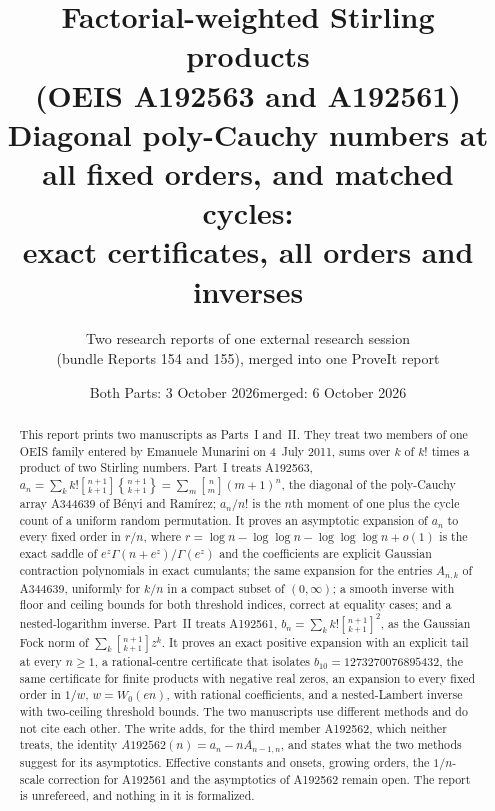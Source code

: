 \documentclass[11pt,letterpaper]{article}
\title{\textbf{Factorial-weighted Stirling products\\ (OEIS A192563 and A192561)}\\[7pt]
\large Diagonal poly-Cauchy numbers at all fixed orders, and matched cycles:\\ exact certificates, all orders and inverses}
\author{Two research reports of one external research session\\(bundle Reports 154 and 155), merged into one ProveIt report}
\date{Both Parts: 3 October 2026\quad merged: 6 October 2026}
\numberwithin{equation}{section}
\theoremstyle{definition}\newtheorem{definition}[theorem]{Definition}
\theoremstyle{remark}\newtheorem{remark}[theorem]{Remark}
\newcommand{\sone}[2]{\genfrac{[}{]}{0pt}{}{#1}{#2}}
\newcommand{\stwo}[2]{\genfrac{\{} {\}}{0pt}{}{#1}{#2}}
\begin{document}
\hypersetup{pageanchor=false}
\maketitle
\begin{abstract}
This report prints two manuscripts as Parts~I and~II. They treat two members of one OEIS family entered by Emanuele Munarini on 4~July 2011, sums over $k$ of $k!$ times a product of two Stirling numbers. Part~I treats A192563, $a_n=\sum_kk!\sone{n+1}{k+1}\stwo{n+1}{k+1}=\sum_m\sone nm(m+1)^n$, the diagonal of the poly-Cauchy array A344639 of B\'enyi and Ram\'irez; $a_n/n!$ is the $n$th moment of one plus the cycle count of a uniform random permutation. It proves an asymptotic expansion of $a_n$ to every fixed order in $r/n$, where $r=\log n-\log\log n-\log\log\log n+o(1)$ is the exact saddle of $e^z\Gamma(n+e^z)/\Gamma(e^z)$ and the coefficients are explicit Gaussian contraction polynomials in exact cumulants; the same expansion for the entries $A_{n,k}$ of A344639, uniformly for $k/n$ in a compact subset of $(0,\infty)$; a smooth inverse with floor and ceiling bounds for both threshold indices, correct at equality cases; and a nested-logarithm inverse. Part~II treats A192561, $b_n=\sum_kk!\sone{n+1}{k+1}^2$, as the Gaussian Fock norm of $\sum_k\sone{n+1}{k+1}z^k$. It proves an exact positive expansion with an explicit tail at every $n\ge1$, a rational-centre certificate that isolates $b_{10}=1273270076895432$, the same certificate for finite products with negative real zeros, an expansion to every fixed order in $1/w$, $w=W_0(en)$, with rational coefficients, and a nested-Lambert inverse with two-ceiling threshold bounds. The two manuscripts use different methods and do not cite each other. The write adds, for the third member A192562, which neither treats, the identity $A192562(n)=a_n-nA_{n-1,n}$, and states what the two methods suggest for its asymptotics. Effective constants and onsets, growing orders, the $1/n$-scale correction for A192561 and the asymptotics of A192562 remain open. The report is unrefereed, and nothing in it is formalized.
\end{abstract}
\hypersetup{pageanchor=true}
\setcounter{tocdepth}{1}
{\small\setlength{\parskip}{0pt}\tableofcontents}
\newpage
\end{document}

